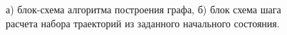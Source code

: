 \begin{figure}[h!]
\begin{minipage}[b]{0.49\linewidth}
      \end{minipage}
      \caption{а) блок-схема алгоритма построения графа, б) блок схема шага расчета набора траекторий из заданного
      начального состояния. }
      \label{img:alg_create_graph}
\end{figure}

